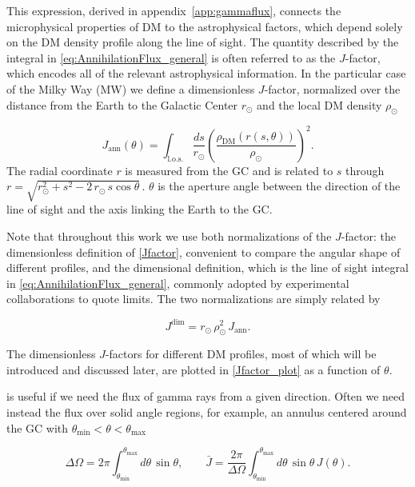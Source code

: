 This expression, derived in appendix~\ref{app:gammaflux}, connects the microphysical properties of DM to the astrophysical factors, which depend solely on the DM density profile along the line of sight.
The quantity described by the integral in \cref{eq:AnnihilationFlux_general} is often referred to as the $J$-factor, which encodes all of the relevant astrophysical information.
In the particular case of the Milky Way (MW) we define a dimensionless $J$-factor, normalized over the distance from the Earth to the Galactic Center $r_\odot$ and the local DM density $\rho_\odot$

\begin{equation} \label{Jfactor}
    J_{\mathrm{ann}} (\theta) = \int_{\text{l.o.s.}} \frac{ds}{r_\odot} \left( \frac{\rho_{\mathrm{DM}}(r(s, \theta))}{\rho_\odot} \right)^2.
\end{equation}
The radial coordinate $r$ is measured from the GC and is related to $s$ through $r = \sqrt{r_\odot^{2} + s^{2} - 2\,r_\odot\, s \cos\theta}\,$. $\theta$ is the aperture angle between the direction of the line of sight and the axis linking the Earth to the GC.

Note that throughout this work we use both normalizations of
the $J$-factor: the dimensionless definition of \cref{Jfactor}, convenient
to compare the angular shape of different profiles, and the 
dimensional definition, which is the line of sight integral in \cref{eq:AnnihilationFlux_general},
commonly adopted by experimental collaborations to quote limits. 
The two normalizations are simply related by 

\begin{equation}
    J^{\mathrm{dim}} = r_\odot \, \rho_\odot^{2} \, J_{\mathrm{ann}}.
\end{equation}

The dimensionless $J$-factors for different DM profiles, most of which will be introduced and discussed later, are plotted in \cref{Jfactor_plot} as a function of $\theta$.


 is useful if we need the flux of gamma rays from a given direction. Often we need instead the flux over solid angle regions, for example, an annulus centered around the GC with $\theta_{\min} < \theta < \theta_{\max}$

\begin{equation}
\Delta\Omega
= 2\pi \int_{\theta_{\min}}^{\theta_{\max}} d\theta\,\sin\theta,
\qquad
\bar{J}
= \frac{2\pi}{\Delta\Omega}\int_{\theta_{\min}}^{\theta_{\max}} d\theta\,\sin\theta\, J(\theta).
\label{eq:DeltaOmega_Jbar}
\end{equation}

